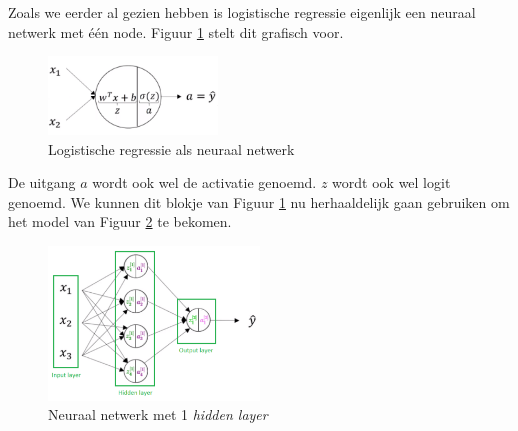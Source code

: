 Zoals we eerder al gezien hebben is logistische regressie eigenlijk een neuraal netwerk met één node. Figuur \ref{fig:neural-network-model-log-reg} stelt dit grafisch voor. 

\begin{figure}[h]
	\centering
	\includegraphics[width=0.4\textwidth]{images/13-neural-network-model-log-reg.png}
	\caption{Logistische regressie als neuraal netwerk}
	\label{fig:neural-network-model-log-reg}
\end{figure}
\noindent
De uitgang $a$ wordt ook wel de activatie genoemd. $z$ wordt ook wel logit genoemd. We kunnen dit blokje van Figuur \ref{fig:neural-network-model-log-reg} nu herhaaldelijk gaan gebruiken om het model van Figuur \ref{fig:neural-network-model-1} te bekomen. 

\begin{figure}[h]
	\centering
	\includegraphics[width=0.5\textwidth]{images/14-neural-network-model-1.png}
	\caption{Neuraal netwerk met 1 \textit{hidden layer}}
	\label{fig:neural-network-model-1}
\end{figure}

